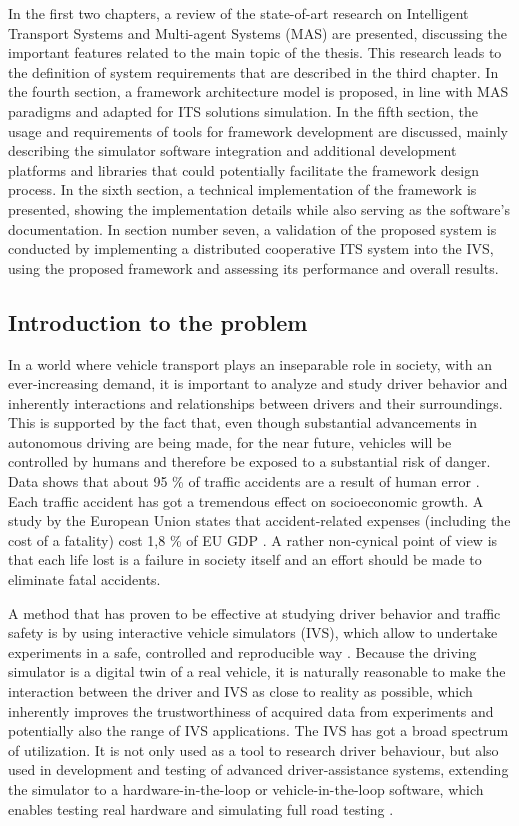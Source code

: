 \documentclass[titlepage, 12pt]{article}
\begin{document}
In the first two chapters, a review of the state-of-art research on Intelligent Transport
Systems and Multi-agent Systems (MAS) are presented, discussing the important features related
to the main topic of the thesis. This research leads to the definition of system requirements
that are described in the third chapter. In the fourth section, a framework architecture model
is proposed, in line with MAS paradigms and adapted for ITS solutions simulation. In the fifth
section, the usage and requirements of tools for framework development are discussed, mainly
describing the simulator software integration and additional development platforms and
libraries that could potentially facilitate the framework design process. In the sixth section,
a technical implementation of the framework is presented, showing the implementation details
while also serving as the software's documentation. In section number seven, a validation of
the proposed system is conducted by implementing a distributed cooperative ITS system into the
IVS, using the proposed framework and assessing its performance and overall results.

\subsection{Introduction to the problem}

In a world where vehicle transport plays an inseparable role in society, with an ever-increasing
demand, it is important to analyze and study driver behavior and inherently interactions and
relationships between drivers and their surroundings. This is supported by the fact that, even though
substantial advancements in autonomous driving are being made, for the near future, vehicles 
will be controlled by humans and therefore be exposed to a substantial risk of danger. 
Data shows that about 95 \% of traffic accidents are a result of human error \cite{Parliament2021}. 
Each traffic accident has got a tremendous effect on socioeconomic growth. A study by the European
Union states that accident-related expenses (including the cost of a fatality) cost 1,8 \% of EU GDP \cite{Wijnen2017}.  
A rather non-cynical point of view is that each life lost is a failure in society itself and an effort
should be made to eliminate fatal accidents.

A method that has proven to be effective at studying driver behavior and traffic safety is by
using interactive vehicle simulators (IVS), which allow to undertake experiments in a safe,
controlled and reproducible way \cite{Winter2012}.  Because the driving simulator is a digital
twin of a real vehicle, it is naturally reasonable to make the interaction between the driver
and IVS as close to reality as possible, which inherently improves the trustworthiness of
acquired data from experiments and potentially also the range of IVS applications. The IVS has
got a broad spectrum of utilization. It is not only used as a tool to research driver
behaviour, but also used in development and testing of advanced driver-assistance systems,
extending the simulator to a hardware-in-the-loop or vehicle-in-the-loop software, which
enables testing real hardware and simulating full road testing \cite{Horvath2019}.
\end{document}
